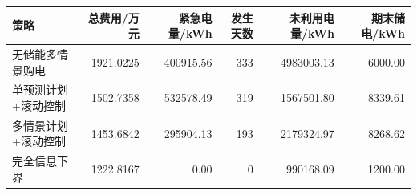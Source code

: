 \begin{tabular}{lrrrrr}
\toprule
策略 & 总费用/万元 & 紧急电量/kWh & 发生天数 & 未利用电量/kWh & 期末储电/kWh \\
\midrule
无储能多情景购电 & 1921.0225 & 400915.56 & 333 & 4983003.13 & 6000.00 \\
单预测计划+滚动控制 & 1502.7358 & 532578.49 & 319 & 1567501.80 & 8339.61 \\
多情景计划+滚动控制 & 1453.6842 & 295904.13 & 193 & 2179324.97 & 8268.62 \\
完全信息下界 & 1222.8167 & 0.00 & 0 & 990168.09 & 1200.00 \\
\bottomrule
\end{tabular}
